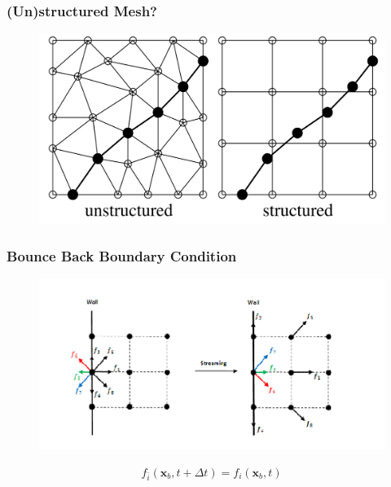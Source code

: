 \documentclass[10pt]{beamer}
\begin{document}
\begin{frame}\frametitle{(Un)structured Mesh?}
\begin{center}
\begin{figure}
\includegraphics[width = 1 \textwidth]{obrazki/(un)structured_mesh.png} 
\end{figure}
\end{center}
\end{frame}

\begin{frame}[fragile]\frametitle{Bounce Back Boundary Condition}
\begin{figure}[H]
\begin{center}
   \includegraphics[width=0.8 \textwidth]{obrazki/bounceBack.png}  
 \end{center}
\end{figure}

\begin{align*} 
f_{\bar{i}}(\boldsymbol{x}_b,t + \Delta t) =  f_i (\boldsymbol{x}_b,t)
\end{align*}  

\end{frame}
\end{document}

